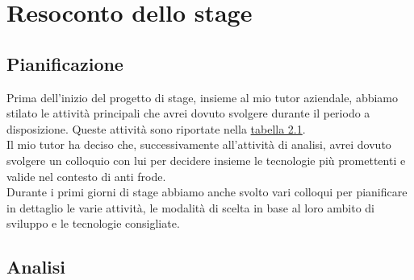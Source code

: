 
\chapter{Resoconto dello stage}
\label{cap:resoconto-stage}

\section{Pianificazione}
Prima dell'inizio del progetto di stage, insieme al mio tutor aziendale, abbiamo stilato le attività principali che avrei dovuto svolgere durante il periodo a disposizione. Queste attività sono riportate nella \hyperref[tab:pian]{tabella 2.1}.\\
Il mio tutor ha deciso che, successivamente all'attività di analisi, avrei dovuto svolgere un colloquio con lui per decidere insieme le tecnologie più promettenti e valide nel contesto di anti frode.\\
Durante i primi giorni di stage abbiamo anche svolto vari colloqui per pianificare in dettaglio le varie attività, le modalità di scelta in base al loro ambito di sviluppo e le tecnologie consigliate.

\section{Analisi}
